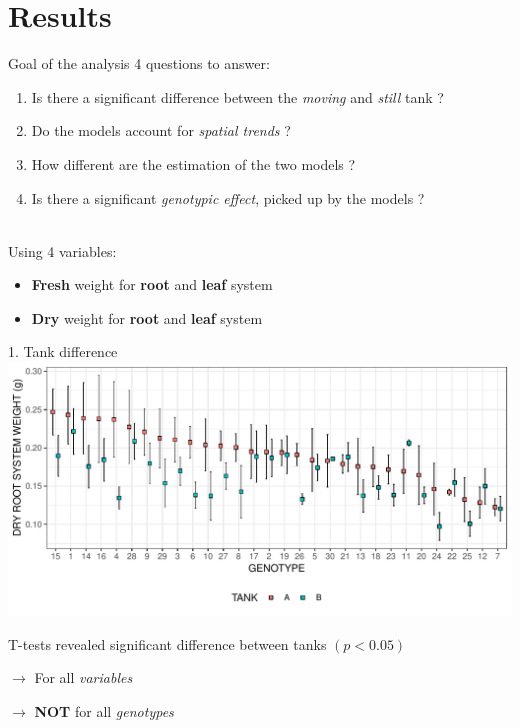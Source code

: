 \documentclass[]{beamer}
\begin{document}
\section{Results}
\begin{frame}{Goal of the analysis}
4 questions to answer:
\begin{enumerate}
	\item Is there a significant difference between the \emph{moving} and \emph{still} tank ? 
	\item Do the models account for \emph{spatial trends} ?
	\item How different are the estimation of the two models ?
	\item Is there a significant \emph{genotypic effect}, picked up by the models ? 
\end{enumerate}
~\\
Using 4 variables:
\begin{itemize}
	\item \textbf{Fresh} weight for \textbf{root} and \textbf{leaf} system
	\item \textbf{Dry} weight for \textbf{root} and \textbf{leaf} system
\end{itemize}
\end{frame}

\begin{frame}{1. Tank difference}
\centering
\includegraphics[height = 0.6\textheight]{Pictures/DRY_RS_summary_plot.pdf}
\begin{flushleft}
T-tests revealed significant difference between tanks $(p<0.05)$

$\rightarrow$ For all \emph{variables}

$\rightarrow$ \textbf{NOT} for all \emph{genotypes}
\end{flushleft}
\end{frame}
\end{document}

